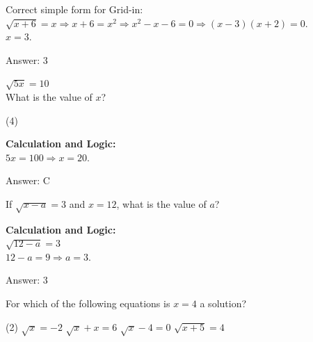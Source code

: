 \documentclass[11pt,paper=a4,answers]{exam}
\begin{document}
\begin{questions}
\begin{solution}
Correct simple form for Grid-in: $\sqrt{x + 6} = x \Rightarrow x+6=x^2 \Rightarrow x^2-x-6=0 \Rightarrow (x-3)(x+2)=0$. \\
$x = 3$.

\vspace{25pt}

Answer: \colorbox{yellow!100}{3}
\end{solution}

\vspace{40pt}

\question
$\sqrt{5x} = 10$ \\
What is the value of $x$?
\begin{tasks}(4)
\end{tasks}

\begin{solution}
\textbf{Calculation and Logic:} \\
$5x = 100 \Rightarrow x = 20$.

\vspace{25pt}

Answer: \colorbox{yellow!100}{C}
\end{solution}

\vspace{40pt}

\question
If $\sqrt{x-a} = 3$ and $x = 12$, what is the value of $a$?

\begin{solution}
\textbf{Calculation and Logic:} \\
$\sqrt{12 - a} = 3$ \\
$12 - a = 9 \Rightarrow a = 3$.

\vspace{25pt}

Answer: \colorbox{yellow!100}{3}
\end{solution}

\vspace{40pt}

\question
For which of the following equations is $x = 4$ a solution?
\begin{tasks}(2)
    \task $\sqrt{x} = -2$
    \task $\sqrt{x} + x = 6$
    \task $\sqrt{x} - 4 = 0$
    \task $\sqrt{x+5} = 4$
\end{tasks}


\end{questions}
\end{document}
